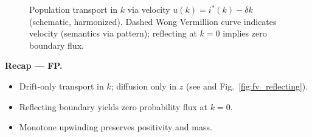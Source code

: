 ﻿\documentclass[11pt,letterpaper,oneside]{article}
\numberwithin{equation}{section}
\newcommand{\1}{\mathbf{1}}
\begin{document}
\begin{figure}[ht]
\centering
{}
\caption{Population transport in $k$ via velocity $u(k)=i^*(k)-\delta k$ (schematic, harmonized). Dashed Wong Vermillion curve indicates velocity (semantics via pattern); reflecting at $k=0$ implies zero boundary flux.}
\label{fig:transport_uk}
\end{figure}

\begin{tcolorbox}[didacticstyle]
\textbf{Recap --- FP.}
\begin{itemize}[leftmargin=1.15em,itemsep=0.2em]
  \item Drift-only transport in $k$; diffusion only in $z$ (see  and Fig.~\ref{fig:fv_reflecting}).
  \item Reflecting boundary yields zero probability flux at $k=0$.
  \item Monotone upwinding preserves positivity and mass.
\end{itemize}
\end{tcolorbox}
\end{document}
